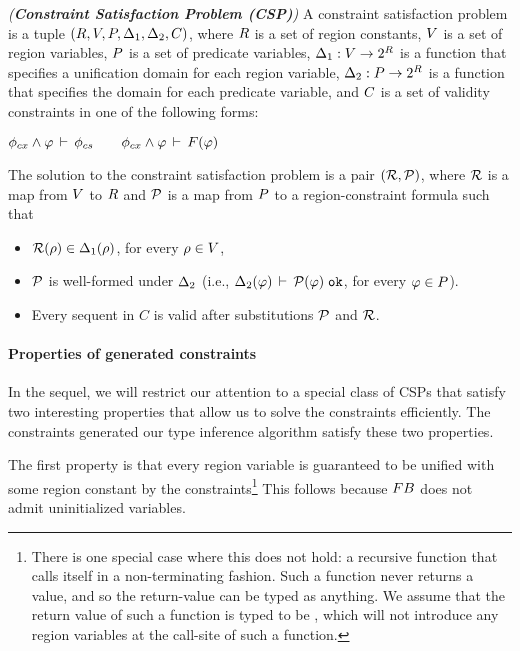 \begin{definition}
\emph{(\textbf{Constraint Satisfaction Problem (CSP)})}
A constraint satisfaction problem is a tuple
$(R, V, P, {\Delta_1}, {\Delta_2}, C)$,
where $R$ is a set of region constants,
$V$ is a set of region variables,
$P$ is a set of predicate variables,
${\Delta_1} : V \rightarrow 2^{R}$ is a function that
specifies a unification domain for each region variable,
${\Delta_2} : P \rightarrow 2^{R}$ is a function that
specifies the domain for each predicate variable,
and $C$ is a set of validity constraints in one of the following forms:
\begin{center}
\(
    \phi_{cx} \wedge \varphi\,\vdash\,\phi_{cs}\qquad
    \phi_{cx} \wedge \varphi\,\vdash\,F(\varphi)
\)
\end{center}
The solution to the constraint satisfaction problem is a pair $(\mathcal{R},\mathcal{P})$,
where $\mathcal{R}$ is a map from $V$ to $R$
and $\mathcal{P}$ is a map from $P$ to a region-constraint formula such that
\begin{itemize}
  \item $\mathcal{R}(\rho) \in {\Delta_1}(\rho)$, for every $\rho \in V$,

  \item $\mathcal{P}$ is well-formed under ${\Delta_2}$
    (i.e., ${\Delta_2}(\varphi)\,\vdash\,\mathcal{P}(\varphi) \; \texttt{ok}$, for every $\varphi \in P$).

  \item Every sequent in $C$ is valid after substitutions $\mathcal{P}$ and $
    \mathcal{R}$.
\end{itemize}
\end{definition}

\paragraph{Properties of generated constraints}
In the sequel, we will restrict our attention to a special class of CSPs that satisfy
two interesting properties that allow us to solve the constraints efficiently.
The constraints generated our type inference algorithm satisfy these two properties.

The first property is that every region variable is guaranteed to be unified with some
region constant by the constraints\footnote{
There is one special case where this does not hold: a recursive function
that calls itself in a non-terminating fashion. Such a function never
returns a value, and so the return-value can be typed as anything.
We assume that the return value of such a function is typed to be ,
which will not introduce any region variables at the call-site of such a function.}
This follows because ${\sc FB}$ does not admit uninitialized variables.

